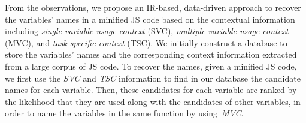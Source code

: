 From the observations, we propose an IR-based, data-driven approach to
recover the variables' names in a minified JS code based
on the contextual information
including \textit{single-variable usage context} (SVC),
\textit{multiple-variable usage context} (MVC), and
\textit{task-specific context} (TSC).
%
We initially construct a database to store
the variables' names and the corresponding context information
extracted from a large corpus of JS code.
%
To recover the names, given a minified JS code, we first use
the \textit{SVC} and \textit{TSC} information to find in our
database the candidate names for each variable. Then, these candidates
for each variable are ranked by the likelihood that they are used
along with the candidates of other variables, in order to name the
variables in the same function by using~\textit{MVC}.
